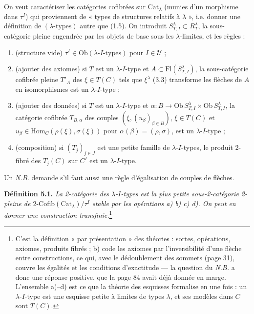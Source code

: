 \documentclass[11pt,a4paper]{article}
\begin{document}
On veut caractériser les catégories cofibrées sur $\mathrm{Cat}_{\lambda}$
(munies d'un morphisme dans $\tau^{I}$) qui proviennent de « types de structures relatifs à $\lambda$ », i.e. donner une définition de $(\lambda\text{-types})$
autre que (1.5). On introduit $S^{\lambda}_{T,I} \subset R^{\lambda}_{T}$, la
sous-catégorie pleine engendrée par les objets de base sous les
$\lambda$-limites, et les règles :
\begin{enumerate}
\item[a)] (structure vide) $\tau^{I} \in \mathrm{Ob}(\lambda\text{-}I\text{-types})$
pour $I \in \mathcal{U}$ ;
\item[b)] (ajouter des axiomes) si $T$ est un $\lambda$-$I$-type et $A
\subset \mathrm{Fl}(S^{\lambda}_{T,I})$, la sous-catégorie cofibrée pleine
$T'_{A}$ des $\xi \in T(C)$ tels que $\xi^{\lambda}$ (3.3) transforme les
flèches de $A$ en isomorphismes est un $\lambda$-$I$-type ;
\item[c)] (ajouter des données) si $T$ est un $\lambda$-$I$-type et $\alpha
: B \to \mathrm{Ob}\,S^{\lambda}_{T,I} \times \mathrm{Ob}\,S^{\lambda}_{T,I}$,
la catégorie cofibrée $T_{B,\alpha}$ des couples $(\xi, (u_{\beta})_{\beta
\in B})$, $\xi \in T(C)$ et $u_{\beta} \in \mathrm{Hom}_{C}(\rho(\xi),
\sigma(\xi))$ pour $\alpha(\beta) = (\rho, \sigma)$, est un
$\lambda$-$I$-type ;
\item[d)] (composition) si $(T_{j})_{j \in J}$ est une petite famille de
$\lambda$-$I$-types, le produit 2-fibré des $T_{j}(C)$ sur $C^{I}$ est un
$\lambda$-$I$-type.
\end{enumerate}
Un \emph{N.B.} demande s'il faut aussi une règle d'égalisation de couples
de flèches.

\textbf{Définition 5.1.} \emph{La 2-catégorie des $\lambda$-$I$-types est la
plus petite sous-2-catégorie 2-pleine de $\text{2-Cofib}(\mathrm{Cat}_{
\lambda})/\tau^{I}$ stable par les opérations a) b) c) d). On peut en donner
une construction transfinie.}\footnote{C'est la définition « par
présentation » des théories : sortes, opérations, axiomes, produits
fibrés ; b) code les axiomes par l'inversibilité d'une flèche entre
constructions, ce qui, avec le dédoublement des sommets (page 31),
couvre les égalités et les conditions d'exactitude — la question du
\emph{N.B.} a donc une réponse positive, que la page 84 avait déjà donnée
en marge. L'ensemble a)--d) est ce que la théorie des esquisses formalise
en une fois : un $\lambda$-$I$-type est une esquisse petite à limites de
types $\lambda$, et ses modèles dans $C$ sont $T(C)$.}
\end{document}
